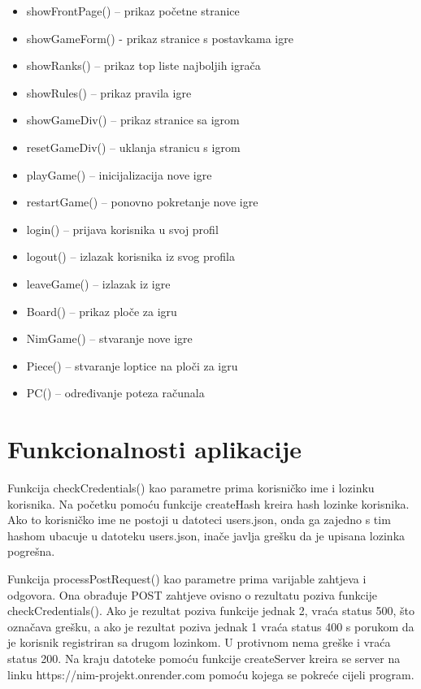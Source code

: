 \begin{itemize} 
\item showFrontPage() – prikaz početne stranice
\item showGameForm() -  prikaz stranice s postavkama igre
\item showRanks() – prikaz top liste najboljih igrača
\item showRules() – prikaz pravila igre
\item showGameDiv() – prikaz stranice sa igrom 
\item resetGameDiv() – uklanja stranicu s igrom
\item playGame() – inicijalizacija nove igre
\item restartGame() – ponovno pokretanje nove igre
\item login() – prijava korisnika u svoj profil
\item logout() – izlazak korisnika iz svog profila
\item leaveGame() – izlazak iz igre
\item Board() – prikaz ploče za igru
\item NimGame() – stvaranje nove igre
\item Piece() – stvaranje loptice na ploči za igru
\item PC() – određivanje poteza računala
\end{itemize}



\section{Funkcionalnosti aplikacije}



Funkcija checkCredentials() kao parametre prima korisničko ime i lozinku korisnika. Na početku pomoću funkcije createHash kreira hash lozinke korisnika. Ako to korisničko ime ne postoji u datoteci users.json, onda ga zajedno s tim hashom ubacuje u datoteku users.json, inače javlja grešku da je upisana lozinka pogrešna.  

Funkcija processPostRequest() kao parametre prima varijable zahtjeva i odgovora. Ona obrađuje POST zahtjeve ovisno o rezultatu poziva funkcije checkCredentials(). Ako je rezultat poziva funkcije jednak 2, vraća status 500, što označava grešku, a ako je rezultat poziva jednak 1 vraća status 400 s porukom da je korisnik registriran sa drugom lozinkom. U protivnom nema greške i vraća status 200. Na kraju datoteke pomoću funkcije createServer kreira se server na linku https://nim-projekt.onrender.com pomoću kojega se pokreće cijeli program.


